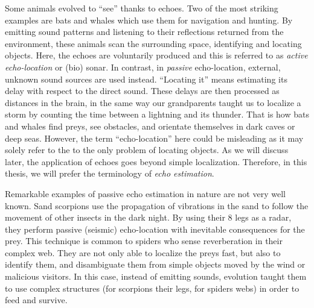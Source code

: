 \mynewline
Some animals evolved to ``see'' thanks to echoes.
Two of the most striking examples are bats and whales which use them for navigation and hunting.
By emitting sound patterns and listening to their reflections returned from the environment, these animals scan the surrounding space, identifying and locating objects.
Here, the echoes are voluntarily produced and this is referred to as \textit{active echo-location} or (bio) sonar.
In contrast, in \textit{passive} echo-location, external, unknown sound sources are used instead.
``Locating it'' means estimating its delay with respect to the direct sound.
These delays are then processed as distances in the brain, in the same way our grandparents taught us to localize a storm by counting the time between a lightning and its thunder.
That is how bats and whales find preys, see obstacles, and orientate themselves in dark caves or deep seas.
However, the term ``echo-location'' here could be misleading as it may solely refer to the to the only problem of locating objects.
As we will discuss later, the application of echoes goes beyond simple localization.
Therefore, in this thesis, we will prefer the terminology of \textit{echo estimation}.

\mynewline
Remarkable examples of passive echo estimation in nature are not very well known.
Sand scorpions use the propagation of vibrations in the sand to follow the movement of other insects in the dark night.
By using their 8 legs as a radar, they perform passive (seismic) echo-location with inevitable consequences for the prey.
This technique is common to spiders who sense reverberation in their complex web.
They are not only able to localize the preys fast, but also to identify them, and disambiguate them from simple objects moved by the wind or malicious visitors.
In this case, instead of emitting sounds, evolution taught them to use complex structures (for scorpions their legs, for spiders webs) in order to feed and survive.

